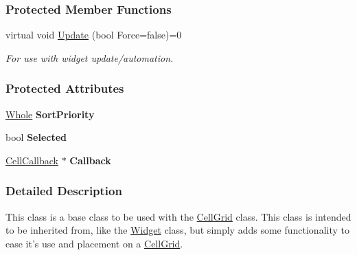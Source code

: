 \subsubsection*{Protected Member Functions}
\begin{DoxyCompactItemize}
\item 
\hypertarget{classphys_1_1UI_1_1Cell_a96227e2648a280f9f7baa0760f8643db}{
virtual void \hyperlink{classphys_1_1UI_1_1Cell_a96227e2648a280f9f7baa0760f8643db}{Update} (bool Force=false)=0}
\label{df/d1e/classphys_1_1UI_1_1Cell_a96227e2648a280f9f7baa0760f8643db}

\begin{DoxyCompactList}\small\item\em For use with widget update/automation. \item\end{DoxyCompactList}\end{DoxyCompactItemize}
\subsubsection*{Protected Attributes}
\begin{DoxyCompactItemize}
\item 
\hypertarget{classphys_1_1UI_1_1Cell_ab5c230b34ef233a3f51b19448ee78b20}{
\hyperlink{namespacephys_a460f6bc24c8dd347b05e0366ae34f34a}{Whole} {\bfseries SortPriority}}
\label{df/d1e/classphys_1_1UI_1_1Cell_ab5c230b34ef233a3f51b19448ee78b20}

\item 
\hypertarget{classphys_1_1UI_1_1Cell_afe3d730ca22d70326aaef627a4707c7d}{
bool {\bfseries Selected}}
\label{df/d1e/classphys_1_1UI_1_1Cell_afe3d730ca22d70326aaef627a4707c7d}

\item 
\hypertarget{classphys_1_1UI_1_1Cell_acb99abbc3dfed845840bc948ba9dda26}{
\hyperlink{classphys_1_1UI_1_1CellCallback}{CellCallback} $\ast$ {\bfseries Callback}}
\label{df/d1e/classphys_1_1UI_1_1Cell_acb99abbc3dfed845840bc948ba9dda26}

\end{DoxyCompactItemize}


\subsubsection{Detailed Description}
This class is a base class to be used with the \hyperlink{classphys_1_1UI_1_1CellGrid}{CellGrid} class. This class is intended to be inherited from, like the \hyperlink{classphys_1_1UI_1_1Widget}{Widget} class, but simply adds some functionality to ease it's use and placement on a \hyperlink{classphys_1_1UI_1_1CellGrid}{CellGrid}. 

